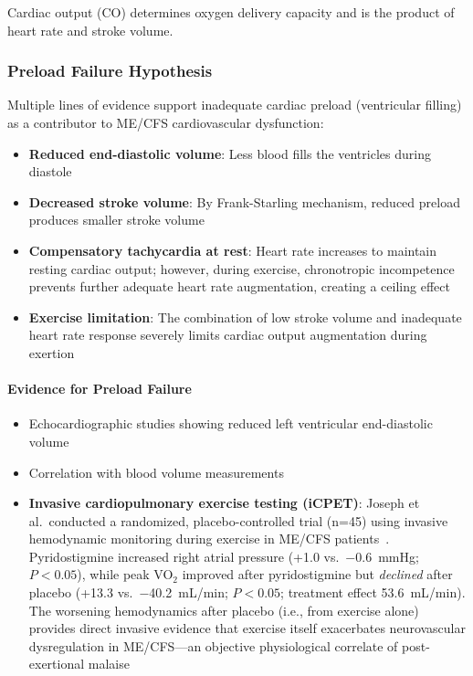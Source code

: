 Cardiac output (CO) determines oxygen delivery capacity and is the product of heart rate and stroke volume.

\subsubsection{Preload Failure Hypothesis}

Multiple lines of evidence support inadequate cardiac preload (ventricular filling) as a contributor to ME/CFS cardiovascular dysfunction:

\begin{itemize}
    \item \textbf{Reduced end-diastolic volume}: Less blood fills the ventricles during diastole
    \item \textbf{Decreased stroke volume}: By Frank-Starling mechanism, reduced preload produces smaller stroke volume
    \item \textbf{Compensatory tachycardia at rest}: Heart rate increases to maintain resting cardiac output; however, during exercise, chronotropic incompetence prevents further adequate heart rate augmentation, creating a ceiling effect
    \item \textbf{Exercise limitation}: The combination of low stroke volume and inadequate heart rate response severely limits cardiac output augmentation during exertion
\end{itemize}

\paragraph{Evidence for Preload Failure}
\begin{itemize}
    \item Echocardiographic studies showing reduced left ventricular end-diastolic volume~\cite{Newton2016}
    \item Correlation with blood volume measurements~\cite{Newton2016}
    \item \textbf{Invasive cardiopulmonary exercise testing (iCPET)}: Joseph et al.\ conducted a randomized, placebo-controlled trial (n=45) using invasive hemodynamic monitoring during exercise in ME/CFS patients~\cite{Joseph2022pyridostigmine}. Pyridostigmine increased right atrial pressure (+1.0 vs.\ $-$0.6~mmHg; $P<0.05$), while peak VO$_2$ improved after pyridostigmine but \emph{declined} after placebo (+13.3 vs.\ $-$40.2~mL/min; $P<0.05$; treatment effect 53.6~mL/min). The worsening hemodynamics after placebo (i.e., from exercise alone) provides direct invasive evidence that exercise itself exacerbates neurovascular dysregulation in ME/CFS---an objective physiological correlate of post-exertional malaise
\end{itemize}

